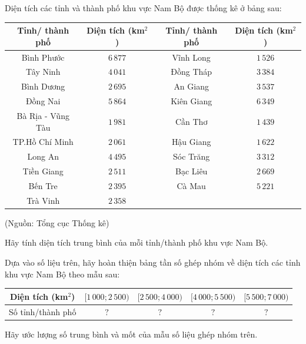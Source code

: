 \begin{ex}%
	Diện tích các tỉnh và thành phố khu vực Nam Bộ được thống  kê ở bảng sau:
	\begin{center}
		\begin{tabular}{|*4{c|}}
			\hline 
			Tỉnh/ thành  phố & Diện tích (km$^2$) & Tỉnh/ thành phố & Diện tích (km$^2$)\\
			\hline 
			Bình Phước & $6\,877$ & Vĩnh  Long & $1\,526$ \\
			 \hline
			 Tây Ninh & $4\,041$ & Đồng Tháp & $3\,384$ \\
			\hline 
			Bình Dương & $2\,695$ & An  Giang & $3\,537$ \\
			 \hline
			Đồng Nai & $5\,864$ & Kiên Giang &  $6\,349$ \\
			\hline 
			Bà Rịa - Vũng Tàu & $1\,981$ & Cần Thơ & $1\,439$  \\
			\hline 
			TP.Hồ Chí Minh & $2\,061$ & Hậu Giang & $1\,622$ \\ 
			 \hline
			Long An &  $4\,495$ & Sóc Trăng & $3\,312$ \\
			 \hline
			Tiền Giang & $2\,511$ & Bạc  Liêu & $2\,669$ \\
			 \hline
			Bến Tre  & $2\,395$ & Cà Mau & $5\,221$ \\
			 \hline
			 Trà Vinh & $2\,358$ & & \\
			\hline 
		\end{tabular}
	\end{center}
	\begin{flushright}
		(Nguồn: Tổng cục  Thống kê)
	\end{flushright}
	\begin{listEX}
		\item Hãy tính diện tích trung bình của mỗi tỉnh/thành phố khu vực  Nam Bộ.
		\item Dựa vào số liệu trên, hãy hoàn thiện bảng tần số ghép nhóm về diện tích các tỉnh khu vực Nam Bộ theo mẫu sau: 
		\begin{center}
			\begin{tabular}{|*5{c|}}
				\hline 
				Diện tích (km$^2$) & $[1\,000; 2\,500)$ & $[2\,500; 4\,000)$  & $[4\,000; 5\,500)$ & $[5\,500; 7\,000)$ \\
				 \hline
				Số tỉnh/thành phố  & $?$ & $?$ & $?$ & $?$ \\
				 \hline
			\end{tabular}
		\end{center}
		\item Hãy ước lượng số  trung bình và mốt của mẫu số liệu ghép nhóm trên.

\end{listEX}
\end{ex}

